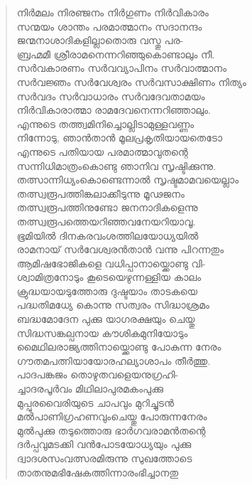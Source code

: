 \begin{verse}
നിര്‍മലം നിരഞ്ജനം നിര്‍ഗുണം നിര്‍വികാരം\\
സന്മയം ശാന്തം പരമാത്മാനം സദാനന്ദം\\
ജന്മനാശാദികളില്ലാതൊരു വസ്തു പര-\\
ബ്രഹ്മമീ ശ്രീരാമനെന്നറിഞ്ഞുകൊണ്ടാലും നീ.\\
സര്‍വകാരണം സര്‍വവ്യാപിനം സര്‍വാത്മാനം\\
സര്‍വജ്ഞം സര്‍വേശ്വരം സര്‍വസാക്ഷിണം നിത്യം\\
സര്‍വദം സര്‍വാധാരം സര്‍വദേവതാമയം\\
നിര്‍വികാരാത്മാ രാമദേവനെന്നറിഞ്ഞാലും.\\
എന്നുടെ തത്ത്വമിനിച്ചൊല്ലിടാമുള്ളവണ്ണം\\
നിന്നോടു, ഞാന്‍താന്‍ മൂലപ്രകൃതിയായതെടോ\\
എന്നുടെ പതിയായ പരമാത്മാവുതന്റെ\\
സന്നിധിമാത്രംകൊണ്ടു ഞാനിവ സൃഷ്ടിക്കുന്നു.\\
തത്സാന്നിധ്യംകൊണ്ടെന്നാല്‍ സൃഷ്ടമാമവയെല്ലാം\\
തത്സ്വരൂപത്തിങ്കലാക്കീടുന്നു മൂഢജനം\\
തത്സ്വരൂപത്തിനുണ്ടോ ജനനാദികളെന്നു\\
തത്സ്വരൂപത്തെയറിഞ്ഞവനേയറിയാവൂ.\\
ഭൂമിയില്‍ ദിനകരവംശത്തിലയോധ്യയില്‍\\
രാമനായ് സര്‍വേശ്വരന്‍താന്‍ വന്നു പിറന്നതും\\
ആമിഷഭോജികളെ വധിപ്പാനായ്ക്കൊണ്ടു വി-\\
ശ്വാമിത്രനോടും കൂടെയെഴുന്നള്ളിയ കാലം\\
ക്രുദ്ധയായടുത്തോരു ദുഷ്ടയാം താടകയെ\\
പദ്ധതിമധ്യേ കൊന്നു സത്വരം സിദ്ധാശ്രമം\\
ബദ്ധമോദേന പുക്കു യാഗരക്ഷയും ചെയ്തു\\
സിദ്ധസങ്കല്പനായ കൗശികമുനിയോടും\\
മൈഥിലരാജ്യത്തിനായ്ക്കൊണ്ടു പോകുന്ന നേരം\\
ഗൗതമപത്നിയായോരഹല്യാശാപം തീര്‍ത്തു.\\
പാദപങ്കജം തൊഴുതവളെയനുഗ്രഹി-\\
ച്ചാദരപൂര്‍വം മിഥിലാപുരമകംപുക്കു\\
മുപ്പുരവൈരിയുടെ ചാപവും മുറിച്ചുടന്‍\\
മല്‍പാണിഗ്രഹണവുംചെയ്തു പോരുന്നനേരം\\
മുല്‍പുക്കു തടുത്തൊരു ഭാര്‍ഗവരാമന്‍തന്റെ\\
ദര്‍പ്പവുമടക്കി വന്‍പോടയോധ്യയും പുക്കു\\
ദ്വാദശസംവത്സരമിരുന്നു സുഖത്തോടെ\\
താതനുമഭിഷേകത്തിന്നാരംഭിച്ചാനതു\\

\end{verse}
